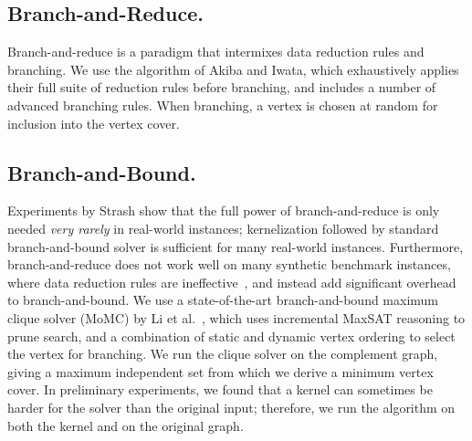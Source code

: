\documentclass[twoside,leqno,twocolumn]{article}
\begin{document}

\subsection{Branch-and-Reduce.}
Branch-and-reduce is a paradigm that intermixes data reduction rules and branching. We use the algorithm of Akiba and Iwata, which exhaustively applies their full suite of reduction rules before branching, and includes a number of advanced branching rules. When branching, a vertex is chosen at random for inclusion into the vertex cover.



\subsection{Branch-and-Bound.} Experiments by Strash \cite{strash2016power} show that the full power of branch-and-reduce is only needed \emph{very rarely} in real-world instances; kernelization followed by standard branch-and-bound solver is sufficient for many real-world instances. Furthermore, branch-and-reduce does not work well on many synthetic benchmark instances, where data reduction rules are ineffective~\cite{akiba-tcs-2016}, and instead add significant overhead to branch-and-bound. We use a state-of-the-art branch-and-bound maximum clique solver (MoMC) by Li et al.~\cite{DBLP:journals/cor/LiJM17}, which uses incremental MaxSAT reasoning to prune search, and a combination of static and dynamic vertex ordering to select the vertex for branching. We run the clique solver on the complement graph, giving a maximum independent set from which we derive a minimum vertex cover. In preliminary experiments, we found that a kernel can sometimes be harder for the solver than the original input; therefore, we run the algorithm on both the kernel and on the original graph.
\end{document}
